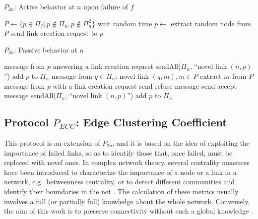 \documentclass[10pt, conference, compsocconf]{IEEEtran}
\begin{document}
\begin{algorithm}[htbp]
\caption{$P_{2n}$: Active behavior at $n$ upon failure of $f$}
\label{alg:active}
\begin{algorithmic}[1]
\State $P \gets \{ p \in \Pi_f | \ p \notin \Pi_n, p \notin \Pi^2_n \}$
\Statex
{}\label{code:control}
  \State wait random time \label{code:wait}
  \State $p \gets$ extract random node from $P$ \label{code:extract}
  \State send link creation request to $p$\label{code:req}
\EndWhile
\end{algorithmic}
\end{algorithm}
\begin{algorithm}
\caption{$P_{2n}$: Passive behavior at $n$}
\label{alg:passive}
\begin{algorithmic}[1]
\Require message from $p$ answering a link creation request
  \label{code:ans_b}
    \State sendAll($\Pi_n$, ``novel link $(n, p)$'')
\State add $p$ to $\Pi_n$
  \EndIf\label{code:ans_e}
\Statex 
\Require message from $q \in \Pi_n$: novel link $(q, m), m \in P$
  \State extract $m$ from $P$\label{code:l_creation}
\Statex 
\Require message from $p$ with a link creation request
  \label{code:l_creat_req_b}
    \State send refuse message
  \Else
    \State send accept message
    \State sendAll($\Pi_n$, ``novel link $(n, p)$'')
\State add $p$ to $\Pi_n$
  \EndIf\label{code:l_creat_req_e}
\end{algorithmic}
\end{algorithm}

\subsection{Protocol $P_{ECC}$: Edge Clustering Coefficient}

This protocol is an extension of $P_{2n}$, and it is based on the idea of exploiting the importance of failed links, so as to identify those that, once failed, must be replaced with novel ones. 
In complex network theory, several centrality measures have been introduced to characterize the importance of a node or a link in a network, e.g.~betweenness centrality, or to detect different communities and identify their boundaries in the net \cite{Bader:2007,girvan,Goncalves:2012,Newman200539}.
The calculation of these metrics usually involves a full (or partially full) knowledge about the whole network. 
Conversely, the aim of this work is to preserve connectivity without such a global knowledge \cite{simplex13,massoulie,VoulgarisGS05}.
\end{document}
